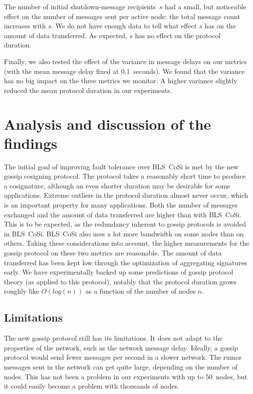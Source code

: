 The number of initial shutdown-message recipients~$s$ had a small, but noticeable effect on the number of messages sent per active node: the total message count increases with $s$.
We do not have enough data to tell what effect $s$ has on the amount of data transferred.
As expected, $s$ has no effect on the protocol duration.

Finally, we also tested the effect of the variance in message delays on our metrics (with the mean message delay fixed at 0.1~seconds).
We found that the variance has no big impact on the three metrics we monitor.
A higher variance slightly reduced the mean protocol duration in our experiments.


\section{Analysis and discussion of the findings}
\label{discussion}

The initial goal of improving fault tolerance over BLS~CoSi is met by the new gossip cosigning protocol.
The protocol takes a reasonably short time to produce a cosignature, although an even shorter duration may be desirable for some applications.
Extreme outliers in the protocol duration almost never occur, which is an important property for many applications.
Both the number of messages exchanged and the amount of data transferred are higher than with BLS~CoSi.
This is to be expected, as the redundancy inherent to gossip protocols is avoided in BLS~CoSi.
BLS~CoSi also uses a lot more bandwidth on some nodes than on others.
Taking these considerations into account, the higher measurements for the gossip protocol on these two metrics are reasonable.
The amount of data transferred has been kept low through the optimization of aggregating signatures early.
We have experimentally backed up some predictions of gossip protocol theory (as applied to this protocol), notably that the protocol duration grows roughly like $O(log(n))$ as a function of the number of nodes $n$.


\subsection{Limitations}

The new gossip protocol still has its limitations.
It does not adapt to the properties of the network, such as the network message delay.
Ideally, a gossip protocol would send fewer messages per second in a slower network.
The rumor messages sent in the network can get quite large, depending on the number of nodes.
This has not been a problem in our experiments with up to 50~nodes, but it could easily become a problem with thousands of nodes.

